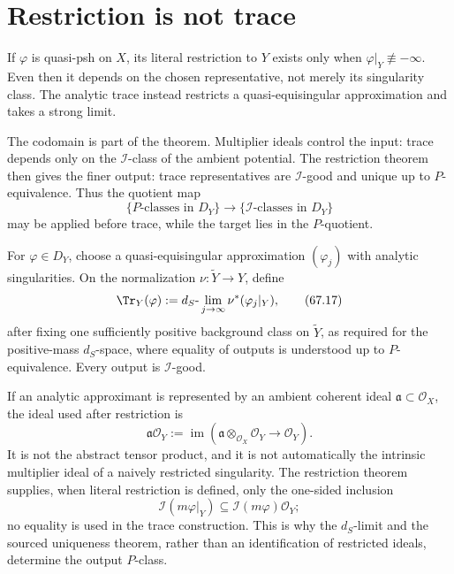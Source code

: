 \section{Restriction is not trace}
\label{sec:functor-restriction}

If $\varphi$ is quasi-psh on $X$, its literal restriction to
$Y$ exists only when $\varphi|_Y\not\equiv-\infty$. Even then it
depends on the chosen representative, not merely its singularity
class. The analytic trace instead restricts a quasi-equisingular
approximation and takes a strong limit.

The codomain is part of the theorem. Multiplier ideals control the input:
trace depends only on the $\mathcal I$-class of the ambient potential.  The
restriction theorem then gives the finer output: trace representatives are
$\mathcal I$-good and unique up to $P$-equivalence. Thus the quotient map
\[
 \{P\text{-classes in }D_Y\}\longrightarrow
 \{\mathcal I\text{-classes in }D_Y\}
\]
may be applied before trace, while the target lies in the $P$-quotient.

\begin{definition}
\label{def:functor-analytic-trace}
For $\varphi\in D_Y$, choose a quasi-equisingular approximation
$(\varphi_j)$ with analytic singularities. On the normalization
$\nu:\widetilde Y\to Y$, define
\[
                   \Tr_Y(\varphi)
       :=d_S\text{-}\lim_{j\to\infty}
                   \nu^*(\varphi_j|_Y),
\tag{67.17}\label{eq:functor-analytic-trace}
\]
after fixing one sufficiently positive background class on
$\widetilde Y$, as required for the positive-mass $d_S$-space,
where equality of outputs is understood up to
$P$-equivalence.  Every output is $\mathcal I$-good.
\end{definition}

\begin{remark}
\label{rem:functor-restricted-image-ideal}
If an analytic approximant is represented by an ambient coherent ideal
$\mathfrak a\subset\mathcal O_X$, the ideal used after restriction is
\[
 \mathfrak a\mathcal O_Y
 :=\operatorname{im}\!\left(
   \mathfrak a\otimes_{\mathcal O_X}\mathcal O_Y
   \longrightarrow\mathcal O_Y\right).
\]
It is not the abstract tensor product, and it is not automatically the
intrinsic multiplier ideal of a naively restricted singularity.  The
restriction theorem supplies, when literal restriction is defined, only
the one-sided inclusion
\[
 \mathcal I(m\varphi|_Y)
 \subseteq \mathcal I(m\varphi)\mathcal O_Y;
\]
no equality is used in the trace construction.  This is why the
$d_S$-limit and the sourced uniqueness theorem, rather than an
identification of restricted ideals, determine the output $P$-class.
\end{remark}

